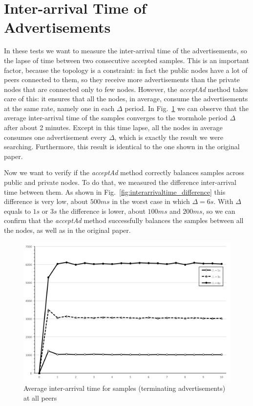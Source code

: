 \section{Inter-arrival Time of Advertisements}
\label{sec:interarrivaltime}
In these tests we want to measure the inter-arrival time of the advertisements, so the lapse of time between two consecutive accepted samples. This is an important factor, because the topology is a constraint: in fact the public nodes have a lot of peers connected to them, so they receive more advertisements than the private nodes that are connected only to few nodes. However, the \textit{acceptAd} method takes care of this: it ensures that all the nodes, in average, consume the advertisements at the same rate, namely one in each $\Delta$ period. In Fig.~\ref{fig:average_interarrivaltime} we can observe that the average inter-arrival time of the samples converges to the wormhole period $\Delta$ after about 2 minutes. Except in this time lapse, all the nodes in average consumes one advertisement every $\Delta$, which is exactly the result we were searching. Furthermore, this result is identical to the one shown in the original paper.

Now we want to verify if the \textit{acceptAd} method correctly balances samples across public and private nodes. To do that, we measured the difference inter-arrival time between them. As shown in Fig.~\ref{fig:interarrivaltime_difference} this difference is very low, about $500 ms$ in the worst case in which $\Delta = 6 s$. With $\Delta$ equals to $1s$ or $3s$ the difference is lower, about $100ms$ and $200ms$, so we can confirm that the \textit{acceptAd} method successfully balances the samples between all the nodes, as well as in the original paper.

\begin{figure}[ht]
  \centering
  \includegraphics[keepaspectratio=true, width=\textwidth]{images/average_interarrivaltime}\caption{Average inter-arrival time for samples (terminating advertisements) at all peers}
  \label{fig:average_interarrivaltime}
\end{figure}

